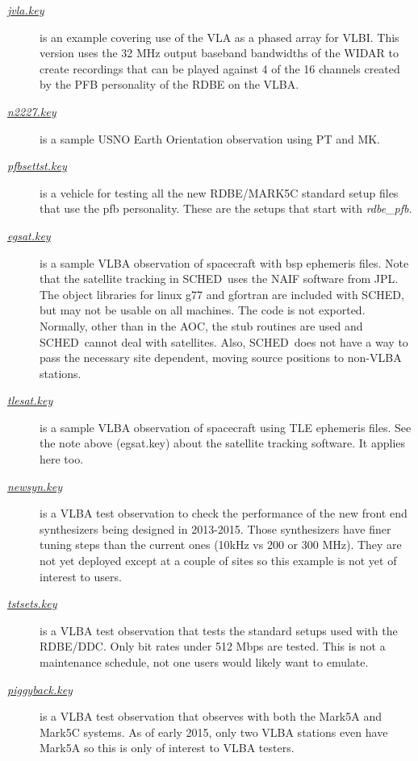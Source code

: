 \documentclass{report}
\newcommand{\schedb}{{\sc SCHED~}}
\begin{document}
\begin{description}
\item[
{\href{examples/jvla.key}{{\sl jvla.key}}}] is
an example covering use of the VLA as a phased array for VLBI.  This
version uses the 32 MHz output baseband bandwidths of the WIDAR to
create recordings that can be played against 4 of the 16 channels
created by the PFB personality of the RDBE on the VLBA.

\item[
{\href{examples/n2227.key}{{\sl n2227.key}}}] is a
sample USNO Earth Orientation observation using PT and MK.

\item[
{\href{examples/pfbsettst.key}{{\sl pfbsettst.key}}}] is a
vehicle for testing all the new RDBE/MARK5C standard setup files that
use the pfb personality.  These are the setups that start with 
{\sl rdbe\_pfb}.

\item[
{\href{examples/egsat.key}{{\sl egsat.key}}}] is a
sample VLBA observation of spacecraft with bsp ephemeris files.  Note
that the satellite tracking in \schedb uses the NAIF software from JPL.
The object libraries for linux g77 and gfortran are included with SCHED, but
may not be usable on all machines.  The code is not exported.  Normally,
other than in the AOC, the stub routines are used and \schedb cannot 
deal with satellites.  Also, \schedb does not have a way to pass the 
necessary site dependent, moving source positions to non-VLBA stations.

\item[
{\href{examples/tlesat.key}{{\sl tlesat.key}}}] is a sample VLBA observation
of spacecraft using TLE ephemeris files.  See the note above (egsat.key) about 
the satellite tracking software.  It applies here too.

\item[
{\href{examples/newsyn.key}{{\sl newsyn.key}}}] is a VLBA test observation
to check the performance of the new front end synthesizers being designed
in 2013-2015.  Those synthesizers have finer tuning steps than the current
ones (10kHz vs 200 or 300 MHz).  They are not yet deployed except at a 
couple of sites so this example is not yet of interest to users.

\item[
{\href{examples/tstsets.key}{{\sl tstsets.key}}}] is a VLBA test observation
that tests the standard setups used with the RDBE/DDC.  Only bit rates under
512 Mbps are tested.  This is not a maintenance schedule, not one users 
would likely want to emulate.

\item[
{\href{examples/piggyback.key}{{\sl piggyback.key}}}] is a VLBA test observation
that observes with both the Mark5A and Mark5C systems.  As of early 2015, only
two VLBA stations even have Mark5A so this is only of interest to VLBA
testers.




\end{description}
\end{document}

